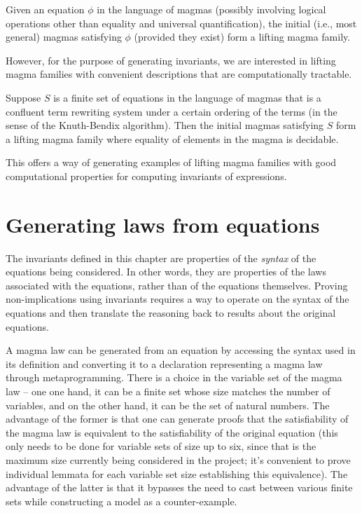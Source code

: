 \begin{remark}
	Given an equation $\phi$ in the language of magmas (possibly involving logical operations other than equality and universal quantification), the initial (i.e., most general) magmas satisfying $\phi$ (provided they exist) form a lifting magma family.

	However, for the purpose of generating invariants, we are interested in lifting magma families with convenient descriptions that are computationally tractable.
\end{remark}

\begin{remark}
	Suppose $S$ is a finite set of equations in the language of magmas that is a confluent term rewriting system under a certain ordering of the terms (in the sense of the Knuth-Bendix algorithm). Then the initial magmas satisfying $S$ form a lifting magma family where equality of elements in the magma is decidable.

	This offers a way of generating examples of lifting magma families with good computational properties for computing invariants of expressions.
\end{remark}

\section{Generating laws from equations}

The invariants defined in this chapter are properties of the \emph{syntax} of the equations being considered. In other words, they are properties of the laws associated with the equations, rather than of the equations themselves. Proving non-implications using invariants requires a way to operate on the syntax of the equations and then translate the reasoning back to results about the original equations.

A magma law can be generated from an equation by accessing the syntax used in its definition and converting it to a declaration representing a magma law through metaprogramming. There is a choice in the variable set of the magma law -- one one hand, it can be a finite set whose size matches the number of variables, and on the other hand, it can be the set of natural numbers. The advantage of the former is that one can generate proofs that the satisfiability of the magma law is equivalent to the satisfiability of the original equation (this only needs to be done for variable sets of size up to six, since that is the maximum size currently being considered in the project; it's convenient to prove individual lemmata for each variable set size establishing this equivalence). The advantage of the latter is that it bypasses the need to cast between various finite sets while constructing a model as a counter-example.

